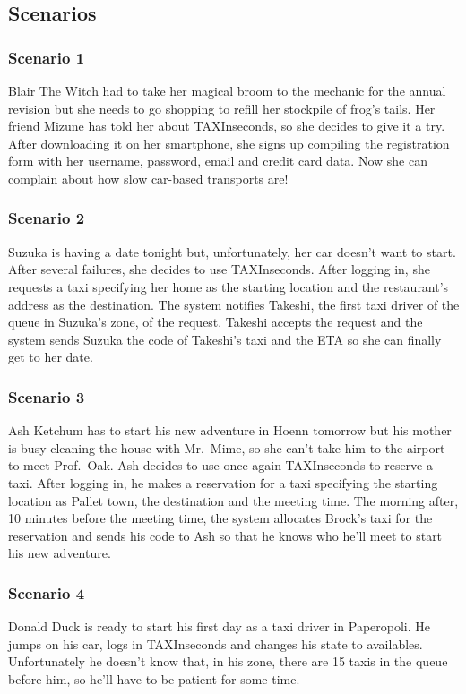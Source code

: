 \documentclass{article}
\begin{document}
\subsection{Scenarios}
\subsubsection{Scenario 1}
Blair The Witch had to take her magical broom to the mechanic for the annual revision but she needs to go shopping to refill her stockpile of frog's tails. Her friend Mizune has told her about TAXInseconds, so she decides to give it a try. After downloading it on her smartphone, she signs up compiling the registration form with her username, password, email and credit card data. Now she can complain about how slow car-based transports are!
\subsubsection{Scenario 2}
Suzuka is having a date tonight but, unfortunately, her car doesn't want to start. After several failures, she decides to use TAXInseconds\@. After logging in, she requests a taxi specifying her home as the starting location and the restaurant's address as the destination. The system notifies Takeshi, the first taxi driver of the queue in Suzuka's zone, of the request. Takeshi accepts the request and the system sends Suzuka the code of Takeshi's taxi and the ETA so she can finally get to her date.
\subsubsection{Scenario 3}
Ash Ketchum has to start his new adventure in Hoenn tomorrow but his mother is busy cleaning the house with Mr.\ Mime, so she can't take him to the airport to meet Prof.\ Oak. Ash decides to use once again TAXInseconds to reserve a taxi. After logging in, he makes a reservation for a taxi specifying the starting location as Pallet town, the destination and the meeting time. The morning after, 10 minutes before the meeting time, the system allocates Brock's taxi for the reservation and sends his code to Ash so that he knows who he'll meet to start his new adventure. 
\subsubsection{Scenario 4}
Donald Duck is ready to start his first day as a taxi driver in Paperopoli. He jumps on his car, logs in TAXInseconds and changes his state to availables. Unfortunately he doesn't know that, in his zone, there are 15 taxis in the queue before him, so he'll have to be patient for some time.
\end{document}
